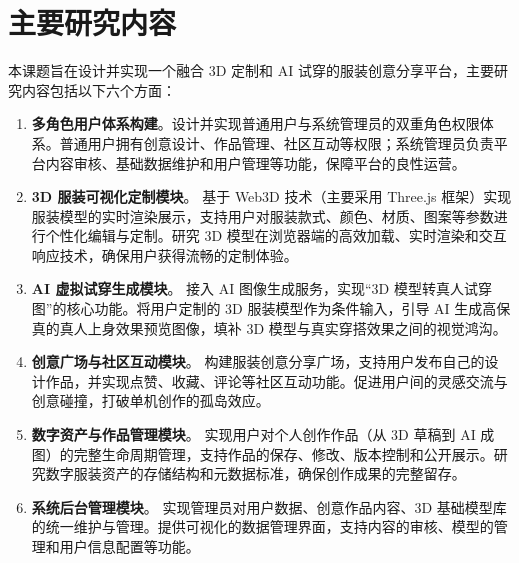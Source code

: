 \documentclass[twoside]{thesis-cls-Miya} %
\begin{document}
\section{主要研究内容}
本课题旨在设计并实现一个融合 3D 定制和 AI 试穿的服装创意分享平台，主要研究内容包括以下六个方面：
\begin{enumerate}[label=(\arabic*)]
	\item \textbf{多角色用户体系构建}。设计并实现普通用户与系统管理员的双重角色权限体系。普通用户拥有创意设计、作品管理、社区互动等权限；系统管理员负责平台内容审核、基础数据维护和用户管理等功能，保障平台的良性运营。
	\item \textbf{3D 服装可视化定制模块}。 基于 Web3D 技术（主要采用 Three.js 框架）实现服装模型的实时渲染展示，支持用户对服装款式、颜色、材质、图案等参数进行个性化编辑与定制。研究 3D 模型在浏览器端的高效加载、实时渲染和交互响应技术，确保用户获得流畅的定制体验。
	\item \textbf{AI 虚拟试穿生成模块}。 接入 AI 图像生成服务，实现“3D 模型转真人试穿图”的核心功能\cite{detailed_garment_recovery}。将用户定制的 3D 服装模型作为条件输入，引导 AI 生成高保真的真人上身效果预览图像，填补 3D 模型与真实穿搭效果之间的视觉鸿沟。
	\item \textbf{创意广场与社区互动模块}。 构建服装创意分享广场，支持用户发布自己的设计作品，并实现点赞、收藏、评论等社区互动功能。促进用户间的灵感交流与创意碰撞，打破单机创作的孤岛效应。
	\item \textbf{数字资产与作品管理模块}。 实现用户对个人创作作品（从 3D 草稿到 AI 成图）的完整生命周期管理，支持作品的保存、修改、版本控制和公开展示。研究数字服装资产的存储结构和元数据标准，确保创作成果的完整留存。
	\item \textbf{系统后台管理模块}。 实现管理员对用户数据、创意作品内容、3D 基础模型库的统一维护与管理。提供可视化的数据管理界面，支持内容的审核、模型的管理和用户信息配置等功能。
\end{enumerate}
\end{document}

